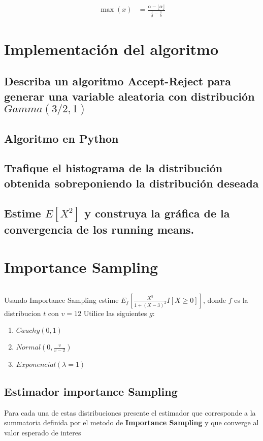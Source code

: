\documentclass{article}
\begin{document}
\[
	\begin{split}
		\max(x) & = \frac{\alpha - \lfloor \alpha \rfloor}{\frac{1}{\beta} - \frac{1}{b}}
	\end{split}
\]

\section{Implementación del algoritmo}

\subsection{Describa un algoritmo \textbf{Accept-Reject} para generar una variable aleatoria con distribución $Gamma(3/2,1)$}


\subsection{Algoritmo en Python}
\subsection{Trafique el histograma de la distribución obtenida sobreponiendo la distribución deseada}

\subsection{Estime $E[X^2]$ y construya la gráfica de la convergencia de los running means.}

\section{Importance Sampling}

\begin{pythonbox}[title={The function}]
	\inputminted{python}{test.py}
\end{pythonbox}

Usando Importance Sampling estime $E_f\left[ \frac{X^5}{1+(X - 3)^2}I[X \ge 0] \right]$, donde $f$ es la
distribucion $t$ con $v=12$ Utilice las siguientes $g$:
\begin{enumerate}
	\item $Cauchy(0,1)$
	\item $Normal(0, \frac{v}{v-2})$
	\item $Exponencial(\lambda=1)$
\end{enumerate}

\subsection{Estimador importance Sampling}
Para cada una de estas distribuciones presente el estimador que corresponde a la summatoria definida
por el metodo de \textbf{Importance Sampling} y que converge al valor esperado de interes
\end{document}
